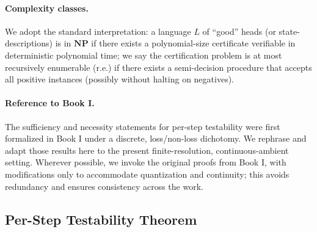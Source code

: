 \documentclass[12pt]{article}
\theoremstyle{definition}
\theoremstyle{plain}
\begin{document}
\paragraph{Complexity classes.} We adopt the standard interpretation: a language \(L\) of ``good'' heads (or state-descriptions) is in \(\mathbf{NP}\) if there exists a polynomial-size certificate verifiable in deterministic polynomial time; we say the certification problem is at most recursively enumerable (r.e.) if there exists a semi-decision procedure that accepts all positive instances (possibly without halting on negatives).

\paragraph{Reference to Book I.} The sufficiency and necessity statements for per-step testability were first formalized in Book I under a discrete, loss/non-loss dichotomy.  We rephrase and adapt those results here to the present finite-resolution, continuous-ambient setting.  Wherever possible, we invoke the original proofs from Book I, with modifications only to accommodate quantization and continuity; this avoids redundancy and ensures consistency across the work.

\subsection{Per-Step Testability Theorem}
\label{subsec:per-step-testability}
\end{document}
